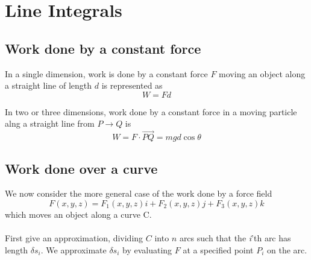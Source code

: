 \section{Line Integrals}
\subsection{Work done by a constant force}
In a single dimension, work is done by a constant force \( F \) moving an
object along a straight line of length \( d \) is represented as
\[ 
  W = Fd
\]

In two or three dimensions, work done by a constant force in a moving particle
alng a straight line from \( P \to Q\) is 
\[ 
  W = F \cdot \overrightarrow{PQ} = mgd\cos \theta  
\]
\subsection{Work done over a curve}
We now consider the more general case of the work done by a force field
\[ 
  F(x,y,z) = F_1(x,y,z)i + F_2(x,y,z)j + F_3(x,y,z)k
\]
which moves an object along a curve C.
\\\\
First give an approximation, dividing \( C \) into \( n \) arcs such that the
\textit{i}'th arc has length \( \delta s_i \). We approximate \( \delta s_i \)
by evaluating \( F \) at a specified point \( P_i \) on the arc. 
